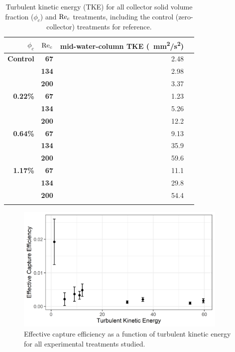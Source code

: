 \documentclass[geosciences,article,submit,moreauthors,pdftex]{Definitions/mdpi}
\begin{document}
\begin{table}[H]
\caption{Turbulent kinetic energy (TKE) for all collector solid volume fraction ($\phi_c$) and $\mathrm{Re}_c$ treatments, including the control (zero-collector) treatments for reference.}
\centering
\begin{tabular}{>{\bfseries}r>{\bfseries}rrr}
\toprule
\textbf{$\phi_c$}&\textbf{$\mathrm{Re}_c$}&\textbf{mid-water-column TKE (\SI{}{\milli\metre^2/\second^2})}\\
\midrule
Control &   67  & \num{2.48}\\
        &   134 & \num{2.98}\\
        &   200 & \num{3.37}\\
\midrule
0.22\% &   67  & \num{1.23}\\
        &   134 & \num{5.26}\\
        &   200 & \num{12.2}\\
\midrule
0.64\% &   67  & \num{9.13}\\
        &   134 & \num{35.9}\\
        &   200 & \num{59.6}\\
\midrule
1.17\%  &   67  & \num{11.1}\\
        &   134 & \num{29.8}\\
        &   200 & \num{54.4}\\
\bottomrule
\label{tbl:turbulence}
\end{tabular}
\end{table}

\begin{figure}[H]
\centering
\includegraphics[width=4in]{../pics/tke.png}
\caption{Effective capture efficiency as a function of turbulent kinetic energy for all experimental treatments studied.}
\label{fig:tke}
\end{figure}   
\end{document}
